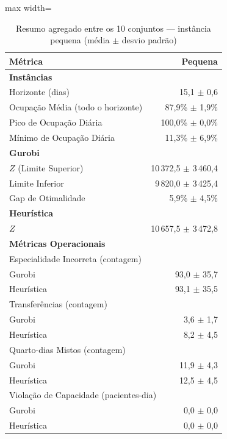 \begin{table}[htbp]
    \caption{Resumo agregado entre os 10 conjuntos --- instância pequena (média $\pm$ desvio padrão)}
    \label{tab:agregado-pequeno}
    \centering
    \begin{adjustbox}{max width=\textwidth}
    \begin{tabular}{lr}
        \hline
        \textbf{Métrica} & \textbf{Pequena} \\
        \hline
        \multicolumn{2}{l}{\textbf{Instâncias}} \\
        Horizonte (dias) & 15,1 $\pm$ 0,6 \\
        Ocupação Média (todo o horizonte) & 87,9\% $\pm$ 1,9\% \\
        Pico de Ocupação Diária & 100,0\% $\pm$ 0,0\% \\
        Mínimo de Ocupação Diária & 11,3\% $\pm$ 6,9\% \\
        \hline
        \multicolumn{2}{l}{\textbf{Gurobi}} \\
        $Z$ (Limite Superior) & 10\,372,5 $\pm$ 3\,460,4 \\
        Limite Inferior & 9\,820,0 $\pm$ 3\,425,4 \\
        Gap de Otimalidade & 5,9\% $\pm$ 4,5\% \\
        \hline
        \multicolumn{2}{l}{\textbf{Heurística}} \\
        $Z$ & 10\,657,5 $\pm$ 3\,472,8 \\
        \hline
        \multicolumn{2}{l}{\textbf{Métricas Operacionais}} \\
        \multicolumn{2}{l}{Especialidade Incorreta (contagem)} \\
        \quad Gurobi & 93,0 $\pm$ 35,7 \\
        \quad Heurística & 93,1 $\pm$ 35,5 \\
        \multicolumn{2}{l}{Transferências (contagem)} \\
        \quad Gurobi & 3,6 $\pm$ 1,7 \\
        \quad Heurística & 8,2 $\pm$ 4,5 \\
        \multicolumn{2}{l}{Quarto-dias Mistos (contagem)} \\
        \quad Gurobi & 11,9 $\pm$ 4,3 \\
        \quad Heurística & 12,5 $\pm$ 4,5 \\
        \multicolumn{2}{l}{Violação de Capacidade (pacientes-dia)} \\
        \quad Gurobi & 0,0 $\pm$ 0,0 \\
        \quad Heurística & 0,0 $\pm$ 0,0 \\
        \hline
    \end{tabular}
    \end{adjustbox}
\end{table}
